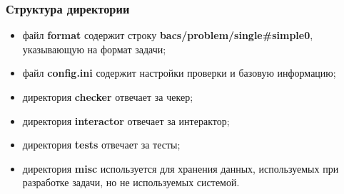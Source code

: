 \subsubsection{Структура директории}
\begin{itemize}
    \item файл \textbf{format} содержит строку \textbf{bacs/problem/single\#simple0},
        указывающую на формат задачи;
    \item файл \textbf{config.ini} содержит настройки проверки и базовую информацию;
    \item директория \textbf{checker} отвечает за чекер;
    \item директория \textbf{interactor} отвечает за интерактор;
    \item директория \textbf{tests} отвечает за тесты;
    \item директория \textbf{misc} используется для хранения данных,
        используемых при разработке задачи,
        но не используемых системой.
\end{itemize}

